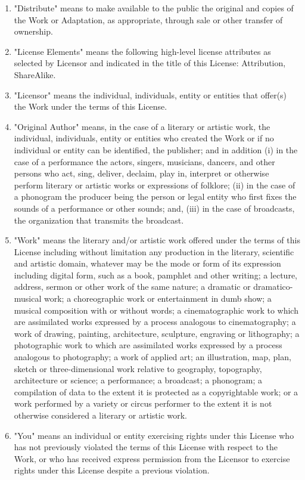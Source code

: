 \documentclass{article}
\begin{document}
{\begin{enumerate}
\begin{enumerate}
		\item "Distribute" means to make available to the public the original and copies of the Work or Adaptation, as appropriate, through sale or other transfer of ownership.
		\item "License Elements" means the following high-level license attributes as selected by Licensor and indicated in the title of this License: Attribution, ShareAlike.
		\item "Licensor" means the individual, individuals, entity or entities that offer(s) the Work under the terms of this License.
		\item "Original Author" means, in the case of a literary or artistic work, the individual, individuals, entity or entities who created the Work or if no individual or entity can be identified, the publisher; and in addition (i) in the case of a performance the actors, singers, musicians, dancers, and other persons who act, sing, deliver, declaim, play in, interpret or otherwise perform literary or artistic works or expressions of folklore; (ii) in the case of a phonogram the producer being the person or legal entity who first fixes the sounds of a performance or other sounds; and, (iii) in the case of broadcasts, the organization that transmits the broadcast.
		\item "Work" means the literary and/or artistic work offered under the terms of this License including without limitation any production in the literary, scientific and artistic domain, whatever may be the mode or form of its expression including digital form, such as a book, pamphlet and other writing; a lecture, address, sermon or other work of the same nature; a dramatic or dramatico-musical work; a choreographic work or entertainment in dumb show; a musical composition with or without words; a cinematographic work to which are assimilated works expressed by a process analogous to cinematography; a work of drawing, painting, architecture, sculpture, engraving or lithography; a photographic work to which are assimilated works expressed by a process analogous to photography; a work of applied art; an illustration, map, plan, sketch or three-dimensional work relative to geography, topography, architecture or science; a performance; a broadcast; a phonogram; a compilation of data to the extent it is protected as a copyrightable work; or a work performed by a variety or circus performer to the extent it is not otherwise considered a literary or artistic work.
		\item "You" means an individual or entity exercising rights under this License who has not previously violated the terms of this License with respect to the Work, or who has received express permission from the Licensor to exercise rights under this License despite a previous violation.

\end{enumerate}
\end{enumerate}}
\end{document}
